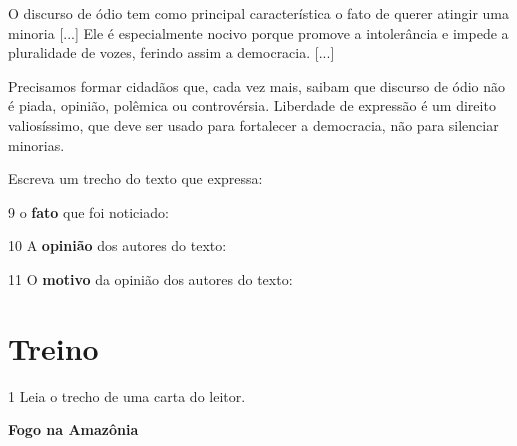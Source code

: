 \begin{conteudo}
\begin{conteudo}
\begin{conteudo}
\begin{conteudo}
\begin{conteudo}
\begin{myquote}
O discurso de ódio tem como principal característica o fato de querer
atingir uma minoria {[}...{]} Ele é especialmente nocivo porque promove
a intolerância e impede a pluralidade de vozes, ferindo assim
a democracia. {[}...{]}

Precisamos formar cidadãos que, cada vez mais, saibam que discurso de
ódio não é piada, opinião, polêmica ou controvérsia. Liberdade de
expressão é um direito valiosíssimo, que deve ser usado para fortalecer
a democracia, não para silenciar minorias.

\end{myquote}

Escreva um trecho do texto que expressa:
\vspace{2em}


\num{9} o \textbf{fato} que foi noticiado: 


\num{10} A \textbf{opinião} dos autores do texto: 


\num{11} O \textbf{motivo} da opinião dos autores do texto: 


\section*{Treino}

\num{1} Leia o trecho de uma carta do leitor.

\begin{myquote}
\textbf{Fogo na Amazônia}


\end{myquote}
\end{conteudo}
\end{conteudo}
\end{conteudo}
\end{conteudo}
\end{conteudo}
